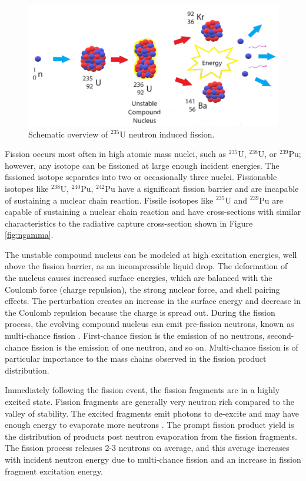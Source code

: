 \begin{figure}[ht]
	\includegraphics[width=\linewidth]{Figures/Chapter2/Fission.png}
	\caption{Schematic overview of $^{235}$U neutron induced fission. }
	\label{fig:fission}	
\end{figure}

Fission occurs most often in high atomic mass nuclei, such as $^{235}$U, $^{238}$U, or $^{239}$Pu; however, any isotope can be fissioned at large enough incident energies. 
The fissioned isotope separates into two or occasionally three nuclei\cite{Bridgman}. 
Fissionable isotopes like $^{238}$U, $^{240}$Pu, $^{242}$Pu have a significant fission barrier and are incapable of sustaining a nuclear chain reaction. 
Fissile isotopes like $^{235}$U and $^{239}$Pu are capable of sustaining a nuclear chain reaction and have cross-sections with similar characteristics to the radiative capture cross-section shown in Figure \ref{fig:ngamma}. 

The unstable compound nucleus can be modeled at high excitation energies, well above the fission barrier, as an incompressible liquid drop\cite{Krane,Tonchev0}. 
The deformation of the nucleus causes increased surface energies, which are balanced with the Coulomb force (charge repulsion), the strong  nuclear force, and shell pairing effects. 
The perturbation creates an increase in the surface energy and decrease in the Coulomb repulsion because the charge is spread out\cite{Randrup2012}. 
During the fission process, the evolving compound nucleus can emit pre-fission neutrons, known as multi-chance fission \cite{Randrup2012}. 
First-chance fission is the emission of no neutrons, second-chance fission is the emission of one neutron, and so on.  
Multi-chance fission is of particular importance to the mass chains observed in the fission product distribution.

Immediately following the fission event, the fission fragments are in a highly excited state.
Fission fragments are generally very neutron rich compared to the valley of stability. 
The excited fragments emit photons to de-excite and may have enough energy to evaporate more neutrons \cite{Randrup2012}. 
The prompt fission product yield is the distribution of products post neutron evaporation from the fission fragments.  
The fission process releases 2-3 neutrons on average, and this average increases with incident neutron energy due to multi-chance fission and an increase in fission fragment excitation energy. 

